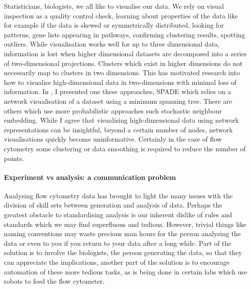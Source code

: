 Statisticians, biologists, we all like to visualise our data.
We rely on visual inspection as a quality control check, learning about properties of the data like for example if the data
is skewed or symmetrically distributed, looking for patterns, gene lists appearing in pathways, confirming clustering results, spotting outliers.
While visualisation works well for up to three dimensional data, information is lost when higher dimensional datasets are decomposed into a series of two-dimensional projections.
Clusters which exist in higher dimensions do not necessarily map to clusters in two dimensions.
This has motivated research into how to visualise high-dimensional data in two-dimensions with minimal loss of information.
In , I presented one these approaches, \gls{SPADE} which relies on a network visualisation of a dataset using a minimum spanning tree.
There are others which use more probabilistic approaches such stochastic neighbour embedding.
While I agree that visualising high-dimensional data using network representations can be insightful, beyond a certain number of nodes, network visualisations quickly become uninformative.
Certainly in the case of flow cytometry some clustering or data smoothing is required to reduce the number of points.  



\paragraph{Experiment vs analysis: a communication problem}

Analysing flow cytometry data has brought to light the many issues with the division of skill sets between generation and analysis of data.
Perhaps the greatest obstacle to standardising analysis is our inherent dislike of rules and standards which we may find superfluous and tedious.
However, trivial things like naming conventions may waste precious man hours for the person analysing the data or even to you if you return to your data after a long while.
Part of the solution is to involve the biologists, the person generating the data, so that they can appreciate the implications, another part of the solution is to encourage automation of these more tedious tasks, as is being done in certain labs which use robots to feed the flow cytometer.

